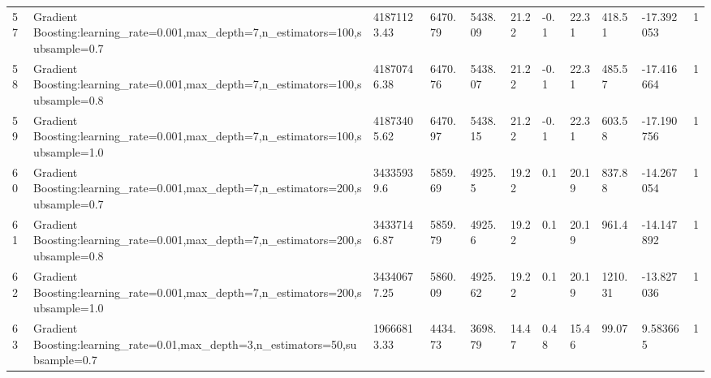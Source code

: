 \begin{longtable}{C{0.8cm} L{2cm} C{1.15cm} C{1.15cm} C{1.15cm} C{1.15cm} C{0.85cm} C{1.25cm} C{1.2cm} C{1.5cm} C{1.0cm}}
57 & Gradient Boosting:\newline learning\_rate=0.001,\newline max\_depth=7,\newline n\_estimators=100,\newline subsample=0.7 & 41871123.43 & 6470.79 & 5438.09 & 21.22 & -0.1 & 22.31 & 418.51 & -17.392053 & 1 \\
58 & Gradient Boosting:\newline learning\_rate=0.001,\newline max\_depth=7,\newline n\_estimators=100,\newline subsample=0.8 & 41870746.38 & 6470.76 & 5438.07 & 21.22 & -0.1 & 22.31 & 485.57 & -17.416664 & 1 \\
59 & Gradient Boosting:\newline learning\_rate=0.001,\newline max\_depth=7,\newline n\_estimators=100,\newline subsample=1.0 & 41873405.62 & 6470.97 & 5438.15 & 21.22 & -0.1 & 22.31 & 603.58 & -17.190756 & 1 \\
60 & Gradient Boosting:\newline learning\_rate=0.001,\newline max\_depth=7,\newline n\_estimators=200,\newline subsample=0.7 & 34335939.6 & 5859.69 & 4925.5 & 19.22 & 0.1 & 20.19 & 837.88 & -14.267054 & 1 \\
61 & Gradient Boosting:\newline learning\_rate=0.001,\newline max\_depth=7,\newline n\_estimators=200,\newline subsample=0.8 & 34337146.87 & 5859.79 & 4925.6 & 19.22 & 0.1 & 20.19 & 961.4 & -14.147892 & 1 \\
62 & Gradient Boosting:\newline learning\_rate=0.001,\newline max\_depth=7,\newline n\_estimators=200,\newline subsample=1.0 & 34340677.25 & 5860.09 & 4925.62 & 19.22 & 0.1 & 20.19 & 1210.31 & -13.827036 & 1 \\
63 & Gradient Boosting:\newline learning\_rate=0.01,\newline max\_depth=3,\newline n\_estimators=50,\newline subsample=0.7 & 19666813.33 & 4434.73 & 3698.79 & 14.47 & 0.48 & 15.46 & 99.07 & 9.583665 & 1 \\

\end{longtable}
